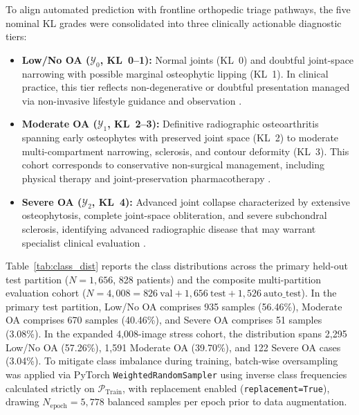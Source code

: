 \documentclass[10pt,journal]{IEEEtran}
\begin{document}
To align automated prediction with frontline orthopedic triage pathways, the five nominal KL grades were consolidated into three clinically actionable diagnostic tiers:
\begin{itemize}[leftmargin=*]
\item \textbf{Low/No OA ($\mathcal{Y}_0$, KL~0--1):} Normal joints (KL~0) and doubtful joint-space narrowing with possible marginal osteophytic lipping (KL~1). In clinical practice, this tier reflects non-degenerative or doubtful presentation managed via non-invasive lifestyle guidance and observation \cite{zhang2010eular}.
\item \textbf{Moderate OA ($\mathcal{Y}_1$, KL~2--3):} Definitive radiographic osteoarthritis spanning early osteophytes with preserved joint space (KL~2) to moderate multi-compartment narrowing, sclerosis, and contour deformity (KL~3). This cohort corresponds to conservative non-surgical management, including physical therapy and joint-preservation pharmacotherapy \cite{zhang2010eular}.
\item \textbf{Severe OA ($\mathcal{Y}_2$, KL~4):} Advanced joint collapse characterized by extensive osteophytosis, complete joint-space obliteration, and severe subchondral sclerosis, identifying advanced radiographic disease that may warrant specialist clinical evaluation \cite{carr2012knee}.
\end{itemize}

Table~\ref{tab:class_dist} reports the class distributions across the primary held-out test partition ($N = 1{,}656$, 828 patients) and the composite multi-partition evaluation cohort ($N = 4{,}008 = 826\ \text{val} + 1{,}656\ \text{test} + 1{,}526\ \text{auto\_test}$). In the primary test partition, Low/No OA comprises 935 samples (56.46\%), Moderate OA comprises 670 samples (40.46\%), and Severe OA comprises 51 samples (3.08\%). In the expanded 4,008-image stress cohort, the distribution spans 2,295 Low/No OA (57.26\%), 1,591 Moderate OA (39.70\%), and 122 Severe OA cases (3.04\%). To mitigate class imbalance during training, batch-wise oversampling was applied via PyTorch \texttt{WeightedRandomSampler} using inverse class frequencies calculated strictly on $\mathcal{P}_{\text{Train}}$, with replacement enabled (\texttt{replacement=True}), drawing $N_{\text{epoch}} = 5{,}778$ balanced samples per epoch prior to data augmentation.
\end{document}
